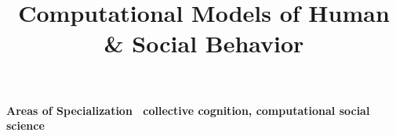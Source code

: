 \documentclass[10pt,a4paper,dvipsnames]{moderncv}
\title{Computational Models of Human \& Social Behavior}
\begin{document}
\hypersetup{
colorlinks=true,
linkcolor=DarkGreen,
urlcolor=DarkGreen,
,citecolor=Green
,citebordercolor=Green
,urlbordercolor=Green
}


\newcommand{\cvdoublecolumn}[2]{%
  \cvitem[0.75em]{}{%
    \begin{minipage}[t]{\listdoubleitemcolumnwidth}#1\end{minipage}%
    \hfill%
    \begin{minipage}[t]{\listdoubleitemcolumnwidth}#2\end{minipage}%
    }%
}

\newcommand{\cvreference}[8]{%
    \textbf{#1}\newline%
    \ifthenelse{\equal{#2}{}}{}{\addresssymbol~#2\newline}%
    \ifthenelse{\equal{#3}{}}{}{#3\newline}%
    \ifthenelse{\equal{#4}{}}{}{#4\newline}%
    \ifthenelse{\equal{#5}{}}{}{#5\newline}%
    \ifthenelse{\equal{#6}{}}{}{\emailsymbol~\texttt{#6}\newline}%
    \ifthenelse{\equal{#7}{}}{}{\phonesymbol~#7\newline}%
    \ifthenelse{\equal{#8}{}}{}{\homepagesymbol~#8}}


\maketitle

\vspace{-1.75em}
\textbf{\textcolor{moderncvgreen}{Areas of Specialization} \ collective cognition, computational social science}
\end{document}
